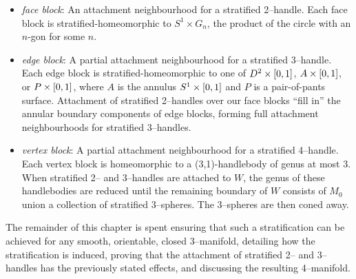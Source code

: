 \begin{itemize}
	\item \emph{face block}:
		An attachment neighbourhood for a stratified 2--handle.
		Each face block is stratified-homeomorphic to $S^1\times G_n$, the product of the circle with an $n$-gon for some $n$.
	
	\item \emph{edge block}:
		A partial attachment neighbourhood for a stratified 3--handle.
		Each edge block is stratified-homeomorphic to one of $D^2\times[0,1]$, $A\times[0,1]$, or $P\times[0,1]$, where $A$ is the annulus $S^1\times[0,1]$ and $P$ is a pair-of-pants surface.
		Attachment of stratified 2--handles over our face blocks ``fill in'' the annular boundary components of edge blocks, forming full attachment neighbourhoods for stratified 3--handles.
		
	\item \emph{vertex block}:
		A partial attachment neighbourhood for a stratified 4--handle.
		Each vertex block is homeomorphic to a (3,1)-handlebody of genus at most 3.
		When stratified 2-- and 3--handles are attached to $W$, the genus of these handlebodies are reduced until the remaining boundary of $W$ consists of $M_0$ union a collection of stratified 3--spheres.  The 3--spheres are then coned away.
\end{itemize}
 
The remainder of this chapter is spent ensuring that such a stratification can be achieved for any smooth, orientable, closed 3--manifold, detailing how the stratification is induced, proving that the attachment of stratified 2-- and 3--handles has the previously stated effects, and discussing the resulting 4--manifold.









%

